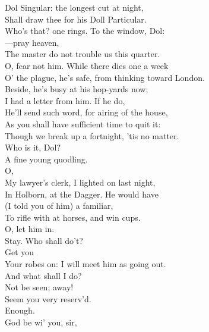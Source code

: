 \documentclass[a4paper,oneside]{memoir}
\begin{document}
\begin{drama*}
Dol Singular: the longest cut at night,\\
Shall draw thee for his Doll Particular.\\
\subtlespeaks Who's that? one rings. To the window, Dol:\\
 ---pray heaven,\\
The master do not trouble us this quarter.\\
\facespeaks  O, fear not him. While there dies one a week\\
O' the plague, he's safe, from thinking toward London.\\
Beside, he's busy at his hop-yards now;\\
I had a letter from him. If he do,\\
He'll send such word, for airing of the house,\\
As you shall have sufficient time to quit it:\\
Though we break up a fortnight, 'tis no matter.\\
\subtlespeaks Who is it, Dol?\\
\dolspeaks {} A fine young quodling.\\
\facespeaks {} O,\\
My lawyer's clerk, I lighted on last night,\\
In Holborn, at the Dagger. He would have\\
(I told you of him) a familiar,\\
To rifle with at horses, and win cups.\\
\dolspeaks O, let him in.\\
\subtlespeaks {} Stay. Who shall do't?\\
\facespeaks {} Get you\\
Your robes on: I will meet him as going out.\\
\dolspeaks And what shall I do?\\
\facespeaks {} Not be seen; away!\\
Seem you very reserv'd.\\
\subtlespeaks {} Enough.\\
\facespeaks {}  God be wi' you, sir,\\

\end{drama*}
\end{document}
